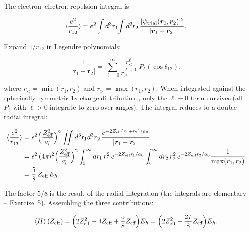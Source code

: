 The electron--electron repulsion integral is
\begin{linenomath}
\begin{equation*}
\braket{\frac{e^{2}}{r_{12}}} = e^{2}\int d^{3}r_{1}\!\int d^{3}r_{2}\,
\frac{|\psi_{\text{trial}}(\bm r_{1},\bm r_{2})|^{2}}{|\bm r_{1}-\bm r_{2}|}.
\end{equation*}
\end{linenomath}
Expand $1/r_{12}$ in Legendre polynomials:
\begin{linenomath}
\begin{equation*}
\frac{1}{|\bm r_{1}-\bm r_{2}|} = \sum_{\ell=0}^{\infty}\frac{r_{<}^{\ell}}{r_{>}^{\ell+1}}\,P_{\ell}(\cos\theta_{12}),
\end{equation*}
\end{linenomath}
where $r_{<} = \min(r_{1},r_{2})$ and $r_{>} = \max(r_{1},r_{2})$. When integrated against the spherically symmetric $1s$ charge distributions, only the $\ell=0$ term survives (all $P_{\ell}$ with $\ell>0$ integrate to zero over angles). The integral reduces to a double radial integral:
\begin{linenomath}
\begin{align*}
\braket{\frac{e^{2}}{r_{12}}} &= e^{2}\Bigl(\frac{Z_{\text{eff}}^{3}}{a_{0}^{3}}\Bigr)^{2}
\iint d^{3}r_{1}d^{3}r_{2}\,
\frac{e^{-2Z_{\text{eff}}(r_{1}+r_{2})/a_{0}}}{|\bm r_{1}-\bm r_{2}|} \\
&= e^{2}\,(4\pi)^{2}\Bigl(\frac{Z_{\text{eff}}^{3}}{a_{0}^{3}}\Bigr)^{2}
\int_{0}^{\infty}dr_{1}\,r_{1}^{2}\,e^{-2Z_{\text{eff}}r_{1}/a_{0}}
\int_{0}^{\infty}dr_{2}\,r_{2}^{2}\,e^{-2Z_{\text{eff}}r_{2}/a_{0}}
\frac{1}{\max(r_{1},r_{2})} \\
&= \frac{5}{8}\,Z_{\text{eff}}\,E_{h}.
\end{align*}
\end{linenomath}
The factor $5/8$ is the result of the radial integration (the integrals are elementary -- Exercise~5). Assembling the three contributions:
\begin{linenomath}
\begin{equation}
\braket{H}(Z_{\text{eff}}) = \Bigl(2Z_{\text{eff}}^{2} - 4Z_{\text{eff}} + \frac{5}{8}Z_{\text{eff}}\Bigr)E_{h}
= \Bigl(2Z_{\text{eff}}^{2} - \frac{27}{8}Z_{\text{eff}}\Bigr)E_{h}.
\label{eq:helium-energy-functional}
\end{equation}
\end{linenomath}

